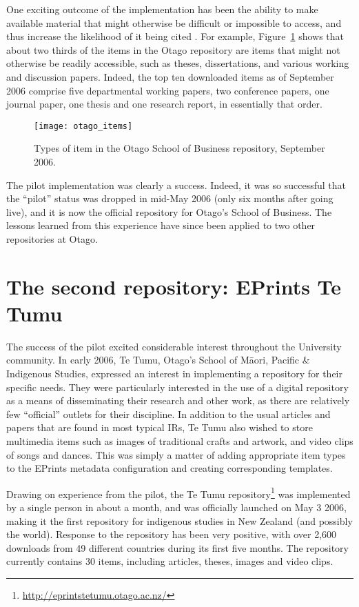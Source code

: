 \documentclass[12pt,pdftex,a4paper,titlepage]{article}
\begin{document}
One exciting outcome of the implementation has been the ability to make  available material that might otherwise be difficult or impossible to access, and thus increase the likelihood of it being cited \cite{Harn-S-2005-research,Hajj-C-2005-citation}. For example, Figure~\ref{fig-item-types} shows that about two thirds of the items in the Otago repository are items that might not otherwise be readily accessible, such as theses, dissertations, and various working and discussion papers. Indeed, the top ten downloaded items as of September 2006 comprise five departmental working papers, two conference papers, one journal paper, one thesis and one research report, in essentially that order.


\begin{figure}
	\centering
	\texttt{[image: otago\_items]}
	\caption{Types of item in the Otago School of Business repository, September 2006.}
	\label{fig-item-types}
\end{figure}


The pilot implementation was clearly a success. Indeed, it was so successful that the ``pilot'' status was dropped in mid-May 2006 (only six months after going live), and it is now the official repository for Otago's School of Business. The lessons learned from this experience have since been applied to two other repositories at Otago.


\section{The second repository: EPrints Te Tumu}

The success of the pilot excited considerable interest throughout the University community. In early 2006, Te Tumu, Otago's School of M\={a}ori, Pacific \& Indigenous Studies, expressed an interest in implementing a repository for their specific needs. They were particularly interested in the use of a digital repository as a means of disseminating their research and other work, as there are relatively few ``official'' outlets for their discipline. In addition to the usual articles and papers that are found in most typical IRs, Te Tumu also wished to store multimedia items such as images of traditional crafts and artwork, and video clips of songs and dances. This was simply a matter of adding  appropriate item types to the EPrints metadata configuration and creating corresponding templates.

Drawing on experience from the pilot, the Te Tumu repository\footnote{\url{http://eprintstetumu.otago.ac.nz/}} was implemented by a single person in about a month, and was officially launched on May 3 2006, making it the first repository for indigenous studies in New Zealand (and possibly the world). Response to the repository has been very positive, with over 2,600 downloads from 49 different countries during its first five months. The repository currently contains 30 items, including articles, theses, images and video clips.
\end{document}
